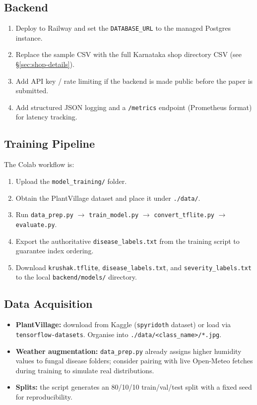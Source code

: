 \documentclass[11pt]{article}
\begin{document}
\subsection{Backend}
\begin{enumerate}
    \item Deploy to Railway and set the \texttt{DATABASE\_URL} to the managed Postgres instance.
    \item Replace the sample CSV with the full Karnataka shop directory CSV (see \S\ref{sec:shop-details}).
    \item Add API key / rate limiting if the backend is made public before the paper is submitted.
    \item Add structured JSON logging and a \texttt{/metrics} endpoint (Prometheus format) for latency tracking.
\end{enumerate}

\subsection{Training Pipeline}
The Colab workflow is:
\begin{enumerate}
    \item Upload the \texttt{model\_training/} folder.
    \item Obtain the PlantVillage dataset and place it under \texttt{./data/}.
    \item Run \texttt{data\_prep.py} $\to$ \texttt{train\_model.py} $\to$ \texttt{convert\_tflite.py} $\to$ \texttt{evaluate.py}.
    \item Export the authoritative \texttt{disease\_labels.txt} from the training script to guarantee index ordering.
    \item Download \texttt{krushak.tflite}, \texttt{disease\_labels.txt}, and \texttt{severity\_labels.txt} to the local \texttt{backend/models/} directory.
\end{enumerate}

\subsection{Data Acquisition}
\begin{itemize}
    \item \textbf{PlantVillage:} download from Kaggle (\texttt{spyridoth} dataset) or load via \texttt{tensorflow-datasets}. Organise into \texttt{./data/<class\_name>/*.jpg}.
    \item \textbf{Weather augmentation:} \texttt{data\_prep.py} already assigns higher humidity values to fungal disease folders; consider pairing with live Open-Meteo fetches during training to simulate real distributions.
    \item \textbf{Splits:} the script generates an 80/10/10 train/val/test split with a fixed seed for reproducibility.
\end{itemize}
\end{document}
